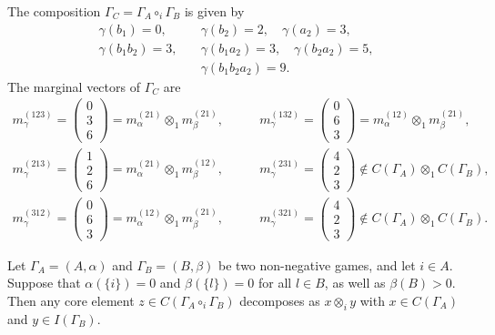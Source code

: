 \documentclass[a4paper,12pt]{amsart}
\begin{document}
\begin{example}
\[    \]
    The composition \(\Gamma_C = \Gamma_A \circ_i \Gamma_B\) is given by 
    \[ \begin{aligned} 
    \gamma(b_1) = 0, \quad & \gamma(b_2) = 2, \quad \gamma(a_2) = 3, \\
    \gamma(b_1b_2) = 3, \quad & \gamma(b_1 a_2) = 3, \quad \gamma(b_2 a_2) = 5, \\
    & \gamma(b_1 b_2 a_2) = 9. 
    \end{aligned} \]
    The marginal vectors of \(\Gamma_C\) are 
    \[ \begin{aligned} 
    m^{(123)}_\gamma = \begin{pmatrix} 0 \\ 3 \\ 6 \end{pmatrix} = m^{(21)}_\alpha \otimes_1 m^{(21)}_\beta, \qquad & m^{(132)}_\gamma = \begin{pmatrix} 0 \\ 6 \\ 3 \end{pmatrix} = m^{(12)}_\alpha \otimes_1 m^{(21)}_\beta, \\
    m^{(213)}_\gamma = \begin{pmatrix} 1 \\ 2 \\ 6 \end{pmatrix} = m^{(21)}_\alpha \otimes_1 m^{(12)}_\beta, \qquad & m^{(231)}_\gamma = \begin{pmatrix} 4 \\ 2 \\ 3 \end{pmatrix} \not \in C(\Gamma_A) \otimes_1 C(\Gamma_B), \\
    m^{(312)}_\gamma = \begin{pmatrix} 0 \\ 6 \\ 3 \end{pmatrix} = m^{(12)}_\alpha \otimes_1 m^{(21)}_\beta, \qquad & m^{(321)}_\gamma = \begin{pmatrix} 4 \\ 2 \\ 3 \end{pmatrix} \not \in C(\Gamma_A) \otimes_1 C(\Gamma_B). 
    \end{aligned} \]
\end{example}

\begin{theorem}\label{thm: fake surjectivity des coeurs}
Let \(\Gamma_A = (A, \alpha)\) and \(\Gamma_B = (B, \beta)\) be two non-negative games, and let \(i \in A\). Suppose that $\alpha(\{i\}) = 0$ and \(\beta(\{l\}) = 0\) for all \(l \in B\),  as well as $\beta(B) > 0$. Then any core element $z \in C(\Gamma_A \circ_i \Gamma_B)$ decomposes as $x \otimes_i y$ with $x \in C(\Gamma_A)$ and $y \in I(\Gamma_B)$. 
\end{theorem}
\end{document}
